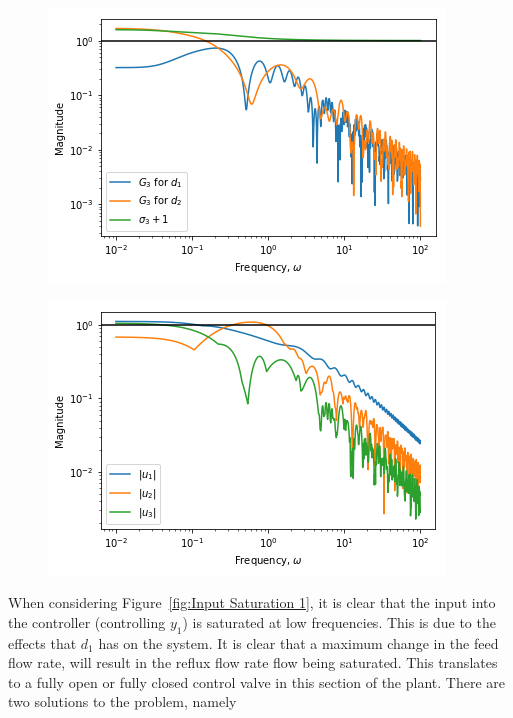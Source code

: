  \begin{figure}[H]
	\centering
	\begin{minipage}{.48\textwidth}
		\centering
		\includegraphics[width=\linewidth]{Figures/InputSaturation3}
		\label{fig:Input Saturation 3}
	\end{minipage}%
	\hfill
	\begin{minipage}{.48\textwidth}
		\centering
		\includegraphics[width=\linewidth]{Figures/Input_Requirements}
		\label{fig:Input Requirements}
	\end{minipage}
\end{figure}

When considering Figure~\ref{fig:Input Saturation 1}, it is clear that the input into the controller (controlling $y_1$) is saturated at low frequencies. This is due to the effects that $d_1$ has on the system. It is clear that a maximum change in the feed flow rate, will result in the reflux flow rate flow being saturated. This translates to a fully open or fully closed control valve in this section of the plant. There are two solutions to the problem, namely

